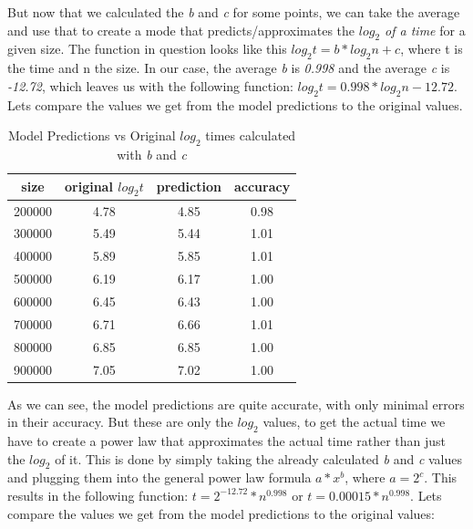 \documentclass[12pt]{article}
\begin{document}
But now that we calculated the \emph{b} and \emph{c} for some points, we can take the average and use 
that to create a mode that predicts/approximates the \emph{$log_2$ of a time} for a given size. The function
in question looks like this \emph{$log_2 t = b * log_2 n + c$}, where t is the time and n the size. In our case,
the average \emph{b} is \emph{0.998} and the average \emph{c} is \emph{-12.72}, which leaves us with the 
following function: \emph{$log_2 t = 0.998 * log_2 n - 12.72$}. Lets compare the values we get from the model 
predictions to the original values.

\begin{table}[h]
    \centering
    \begin{tabular}{|c|c|c|c|}
        \hline size & original $log_2t$ & prediction & accuracy \\
        \hline 200000 & 4.78 & 4.85 & 0.98 \\
        \hline 300000 & 5.49 & 5.44 & 1.01 \\
        \hline 400000 & 5.89 & 5.85 & 1.01 \\
        \hline 500000 & 6.19 & 6.17 & 1.00 \\
        \hline 600000 & 6.45 & 6.43 & 1.00 \\
        \hline 700000 & 6.71 & 6.66 & 1.01 \\
        \hline 800000 & 6.85 & 6.85 & 1.00 \\
        \hline 900000 & 7.05 & 7.02 & 1.00 \\
        \hline
    \end{tabular}
    \caption{\small{Model Predictions vs Original $log_2$ times calculated with \emph{b} and \emph{c}}}
\end{table}

As we can see, the model predictions are quite accurate, with only minimal errors in their accuracy.
But these are only the $log_2$ values, to get the actual time we have to create a power law that approximates the actual time rather 
than just the $log_2$ of it. This is done by simply taking the already calculated \emph{b} and \emph{c} values and
plugging them into the general power law formula \emph{$a * x^b$}, where \emph{$a = 2^c$}. This results in the following
function: \emph{$t = 2^{-12.72} * n^{0.998}$} or \emph{$t = 0.00015 * n^{0.998}$}. Lets compare the values we get from the model predictions to the original values:
\end{document}
